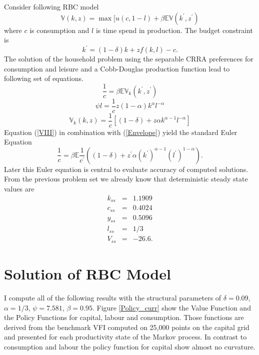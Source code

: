 \documentclass[a4paper,12pt]{article}
\begin{document}
Consider following RBC model 
\begin{equation*}
\mathbb{V}\left( k,z\right) =\max [u\left( c,1-l\right) +\beta \mathbb{E}\mathbb{V}\left( k^{\prime},z^{\prime}\right)
\end{equation*}
where $c$ is consumption and $l$ is time spend in production.
The budget constraint is
\begin{equation*}
k^{\prime }=\left( 1-\delta \right) k+zf\left( k,l\right) -c.
\end{equation*}
The solution of the household problem using the separable CRRA preferences for consumption and leisure and a Cobb-Douglas production function lead to following set of equations.
\begin{equation}
\frac{1}{c}=\beta \mathbb{E}\mathbb{V}_{k}\left( k^{\prime },z^{\prime }\right) 
\label{VIII}
\end{equation}
\begin{equation*}
\psi l=\frac{1}{c}z\left( 1-\alpha \right) k^{\alpha}l^{-\alpha }
\end{equation*}
\begin{equation}
\mathbb{V}_{k}\left( k,z\right) =\frac{1}{c}\left[ \left( 1-\delta \right)+z\alpha k^{\alpha -1}l^{-\alpha }\right] 
\label{Envelope}
\end{equation}
Equation (\ref{VIII}) in combination with (\ref{Envelope}) yield the standard Euler Equation 
\begin{equation}
\frac{1}{c}=\beta \mathbb{E}\frac{1}{c^{\prime }}\left( \left( 1-\delta \right)+z^{\prime }\alpha \left( k^{\prime }\right) ^{\alpha -1}\left( l^{\prime}\right) ^{1-\alpha }\right).
\label{IX}
\end{equation}
Later this Euler equation is central to evaluate accuracy of computed solutions. From the previous problem set we already know that deterministic steady state values are 
\begin{eqnarray*}
k_{ss} &=&1.1909 \\
c_{ss} &=&0.4024 \\
y_{ss} &=&0.5096 \\
l_{ss} &=&1/3\\
V_{ss} &=&-26.6.
\end{eqnarray*}

\section*{Solution of RBC Model}

I compute all of the following results with the structural parameters of $\delta =0.09$, $\alpha =1/3$, $\psi =7.581$, $\beta =0.95$. Figure \ref{Policy_curr} show the Value Function and the Policy Functions for capital, labour and consumption. Those functions are derived from the benchmark VFI computed on 25,000 points on the capital grid and presented for each productivity state of the Markov process. In contrast to consumption and labour the policy function for capital show almost no curvature.  
\end{document}
